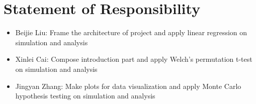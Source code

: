 \documentclass[12pt]{article}
\numberwithin{figure}{section}
\begin{document}
\section{Statement of Responsibility}
\begin{itemize}
    \item Beijie Liu: Frame the architecture of project and apply linear regression on simulation and analysis
    \item Xinlei Cai: Compose introduction part and apply Welch's permutation t-test on simulation and analysis
    \item Jingyan Zhang: Make plots for data visualization and apply Monte Carlo hypothesis testing on simulation and analysis
\end{itemize}


\newpage
\nocite{*}
\printbibliography
\end{document}
